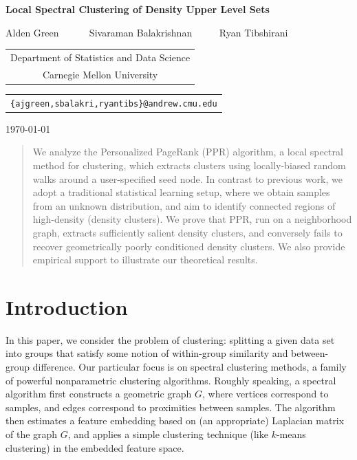 \documentclass[11pt,twoside]{article}
\newcommand{\1}{\mathbf{1}}
\begin{document}
\begin{center} {\Large{\bf{Local Spectral Clustering of Density Upper Level Sets}}}

\vspace*{.3cm}

{\large{
\begin{center}
Alden Green ~~~~~ Sivaraman Balakrishnan~~~~~ Ryan Tibshirani\\
\vspace{.2cm}
\end{center}


\begin{tabular}{c}
Department of Statistics and Data Science \\
Carnegie Mellon University
\end{tabular}

\vspace*{.2in}

\begin{tabular}{c}
\texttt{\{ajgreen,sbalakri,ryantibs\}@andrew.cmu.edu}
\end{tabular}
}}

\vspace*{.2in}

\today
\vspace*{.2in}

\begin{abstract}
\noindent We analyze the Personalized PageRank (PPR) algorithm, a local spectral method for clustering,
which extracts clusters using locally-biased random walks around a user-specified
seed node.  In contrast to previous work, we adopt a traditional statistical
learning setup, where we obtain samples from an unknown distribution, and aim to
identify connected regions of high-density (density clusters).  We prove that
PPR, run on a neighborhood graph, extracts sufficiently salient density
clusters, and conversely fails to recover geometrically poorly conditioned density clusters. We also provide empirical support to illustrate our theoretical results.
\end{abstract}
\end{center}
\section{Introduction}
\label{sec: introduction}
In this paper, we consider the problem of clustering: splitting a given data set
into groups that satisfy some notion of within-group similarity and
between-group difference.  Our particular focus is on
spectral clustering methods, a family of powerful
nonparametric clustering algorithms. Roughly speaking, a spectral algorithm
first constructs a geometric graph $G$, where vertices correspond to samples,
and edges correspond to proximities between samples. The algorithm 
then estimates a feature
embedding based on (an appropriate) Laplacian matrix of the graph 
$G$, and applies a simple clustering
technique (like $k$-means clustering) in the embedded feature space.
\end{document}
